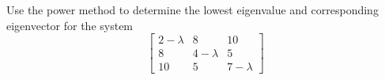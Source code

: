 \documentclass{article}
\begin{document}
\setcounter{problem}{2}
\begin{problem}
Use the power method to determine the lowest eigenvalue and corresponding eigenvector for the system
\[
\begin{bmatrix}
2-\lambda	&	8			&	10			\\
8			&	4-\lambda	&	5			\\
10			&	5			&	7-\lambda
\end{bmatrix}
\]
\end{problem}
\end{document}
